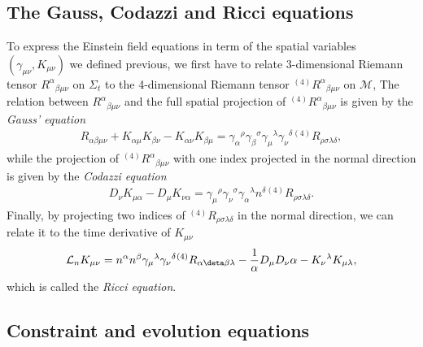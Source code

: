 \subsection{The Gauss, Codazzi and Ricci equations}
\label{section1.2.4}

To express the Einstein field equations in term of the spatial variables $(\gamma_{\mu\nu}, K_{\mu\nu})$ we defined previous,
we first have to relate 3-dimensional Riemann tensor $R^\alpha{}_{\beta\mu\nu}$ on $\Sigma_t$ to the 4-dimensional Riemann tensor ${}^{(4)}R^\alpha{}_{\beta\mu\nu}$ on $\mathcal{M}$,
The relation between $R^\alpha{}_{\beta\mu\nu}$ and the full spatial projection of ${}^{(4)}R^\alpha{}_{\beta\mu\nu}$ is given by the \textit{Gauss' equation}
\begin{align}\label{eq:Gauss}
    R_{\alpha\beta\mu\nu} + K_{\alpha\mu}K_{\beta\nu} - K_{\alpha\nu} K_{\beta\mu} = \gamma_{\alpha}{}^{\rho} \gamma_{\beta}{}^{\sigma} \gamma_{\mu}{}^{\lambda} \gamma_{\nu}{}^{\delta} {}^{(4)}R_{\rho\sigma\lambda\delta},
\end{align}
while the projection of ${}^{(4)}R^\alpha{}_{\beta\mu\nu}$ with one index projected in the normal direction is given by the \textit{Codazzi equation}
\begin{align}\label{eq:Codazzi}
    D_{\nu} K_{\mu\alpha} - D_{\mu} K_{\nu\alpha} = \gamma_{\mu}{}^{\rho} \gamma_{\nu}{}^{\sigma} \gamma_{\alpha}{}^{\lambda} n^{\delta} {}^{(4)}R_{\rho\sigma\lambda\delta}.
\end{align}
Finally, by projecting two indices of ${}^{(4)}R_{\rho\sigma\lambda\delta}$ in the normal direction,
we can relate it to the time derivative of $K_{\mu\nu}$
\begin{align}\label{eq:Ricci}
    \mathcal{L}_n K_{\mu\nu} = n^{\alpha} n^{\beta} \gamma_{\mu}{}^{\lambda} \gamma_{\nu}{}^{\delta} {}^{(4)}R_{\alpha\deta\beta\lambda} - \frac{1}{\alpha} D_{\mu} D_\nu \alpha - K_{\nu}{}^{\lambda}K_{\mu\lambda},
\end{align}
which is called the \textit{Ricci equation}.

\subsection{Constraint and evolution equations} %
\label{section1.2.5}

